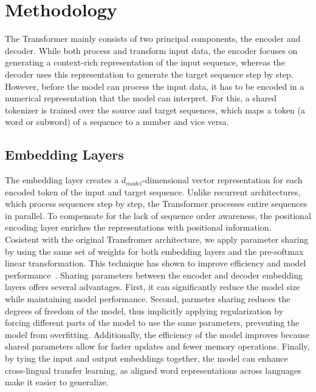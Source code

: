 \section{Methodology} The Transformer mainly consists of two principal components, the encoder and decoder.
While both process and transform input data, the encoder focuses on generating a context-rich representation of the input sequence, whereas the decoder uses this representation to generate the target sequence step by step.
However, before the model can process the input data, it has to be encoded in a numerical representation that the model can interpret.
For this, a shared tokenizer is trained over the source and target sequences, which maps a token (a word or subword) of a sequence to a number and vice versa. 


\subsection{Embedding Layers} 
The embedding layer creates a \texttt{$d_{model}$}-dimensional vector representation for each encoded token of the input and target sequence. 
Unlike recurrent architectures, which process sequences step by step, the Transformer processes entire sequences in parallel. 
To compensate for the lack of sequence order awareness, the positional encoding layer enriches the representations with positional information. \\
Cosistent with the original Transfromer architecture, we apply parameter sharing by using the same set of weights for both embedding layers and the pre-softmax linear transformation. This technique has shown to improve efficiency and model performance~\cite{press2017usingoutputembeddingimprove}.
Sharing parameters between the encoder and decoder embedding layers offers several advantages.
First, it can significantly reduce the model size while maintaining model performance.
Second, parmeter sharing reduces the degrees of freedom of the model, thus implicitly applying regularization by forcing different parts of the model to use the same parameters, preventing the model from overfitting.
Additionally, the efficiency of the model improves because shared parameters allow for faster updates and fewer memory operations.
Finally, by tying the input and output embeddings together, the model can enhance cross-lingual transfer learning, as aligned word representations across languages make it easier to generalize.

